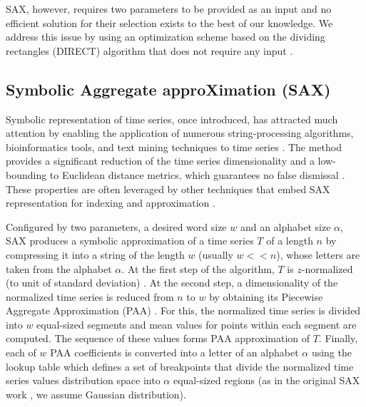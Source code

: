 \documentclass[conference]{IEEEtran}
\begin{document}
SAX, however, requires two parameters to be provided as an input and 
no efficient solution for their selection exists to the best of our knowledge. 
We address this issue by using an optimization scheme based on the dividing 
rectangles (DIRECT) algorithm that does not require any input \cite{direct}. 

\subsection{Symbolic Aggregate approXimation (SAX)} \label{section-sax}
Symbolic representation of time series, once introduced, has attracted much attention by
enabling the application of numerous string-processing algorithms, bioinformatics tools, 
and text mining techniques to time series \cite{sax}. The method provides a significant 
reduction of the time series dimensionality and a low-bounding to Euclidean distance 
metrics, which guarantees no false dismissal \cite{exp_sax}.
These properties are often leveraged by other techniques that embed SAX 
representation for indexing and approximation \cite{fast-shapelets}.

Configured by two parameters, a desired word size $w$ and an alphabet size $\alpha$,
SAX produces a symbolic approximation of a time series $T$ of a length $n$ by compressing 
it into a string of the length $w$ (usually $w<<n$), whose letters are taken from 
the alphabet $\alpha$. 
At the first step of the algorithm, $T$ is $z$-normalized (to unit of standard deviation)
\cite{goldin_kanellakis}. 
At the second step, a dimensionality of the normalized time series is reduced from $n$ to $w$ by
obtaining its Piecewise Aggregate Approximation (PAA) \cite{paa}. 
For this, the normalized time series is divided into $w$ equal-sized segments 
and mean values for points within each segment are computed.
The sequence of these values forms PAA approximation of $T$. 
Finally, each of $w$ PAA coefficients is converted into a letter of an alphabet 
$\alpha$ using the lookup table which defines a set of breakpoints that divide 
the normalized time series values distribution space into $\alpha$ equal-sized regions
(as in the original SAX work \cite{sax}, we assume Gaussian distribution).
\end{document}
